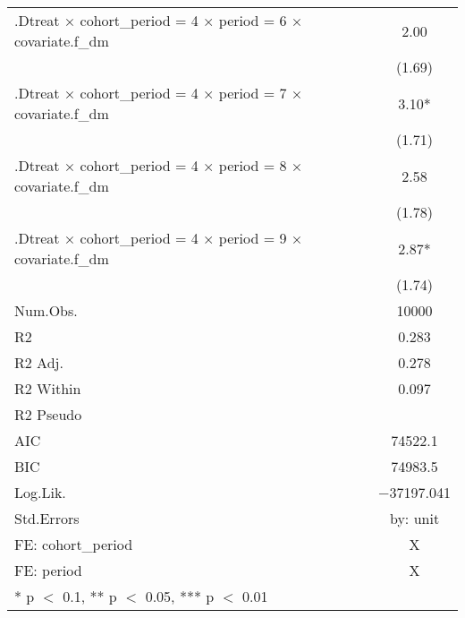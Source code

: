 \begin{table}
\begin{tabular}[t]{lc}
.Dtreat × cohort\_period = 4 × period = 6 × covariate.f\_dm & \num{2.00}\\
 & (\num{1.69})\\
.Dtreat × cohort\_period = 4 × period = 7 × covariate.f\_dm & \num{3.10}*\\
 & (\num{1.71})\\
.Dtreat × cohort\_period = 4 × period = 8 × covariate.f\_dm & \num{2.58}\\
 & (\num{1.78})\\
.Dtreat × cohort\_period = 4 × period = 9 × covariate.f\_dm & \num{2.87}*\\
 & (\num{1.74})\\
\midrule
Num.Obs. & \num{10000}\\
R2 & \num{0.283}\\
R2 Adj. & \num{0.278}\\
R2 Within & \num{0.097}\\
R2 Pseudo & \\
AIC & \num{74522.1}\\
BIC & \num{74983.5}\\
Log.Lik. & \num{-37197.041}\\
Std.Errors & by: unit\\
FE: cohort_period & X\\
FE: period & X\\
\bottomrule
\multicolumn{2}{l}{\rule{0pt}{1em}* p $<$ 0.1, ** p $<$ 0.05, *** p $<$ 0.01}\\
\end{tabular}
\end{table}
